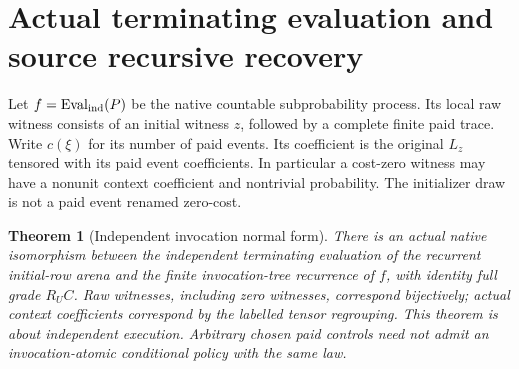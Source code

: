 \documentclass[11pt]{article}
\newtheorem{theorem}{Theorem}\newtheorem{definition}{Definition}
\begin{document}
\section{Actual terminating evaluation and source recursive recovery}
Let $f=\operatorname{Eval}_{\rm ind}(P)$ be the native countable subprobability
process. Its local raw witness consists of an initial witness $z$, followed
by a complete finite paid trace. Write $c(\xi)$ for its number of paid
events. Its coefficient is the original $L_z$ tensored with its paid event
coefficients. In particular a cost-zero witness may have a nonunit context
coefficient and nontrivial probability. The initializer draw is not a paid
event renamed zero-cost.

\begin{theorem}[Independent invocation normal form]
There is an actual native isomorphism between the independent terminating
evaluation of the recurrent initial-row arena and the finite invocation-tree
recurrence of $f$, with identity full grade $R_U C$. Raw witnesses, including
zero witnesses, correspond bijectively; actual context coefficients correspond
by the labelled tensor regrouping. This theorem is about independent
execution. Arbitrary chosen paid controls need not admit an invocation-atomic
conditional policy with the same law.
\end{theorem}
\end{document}
